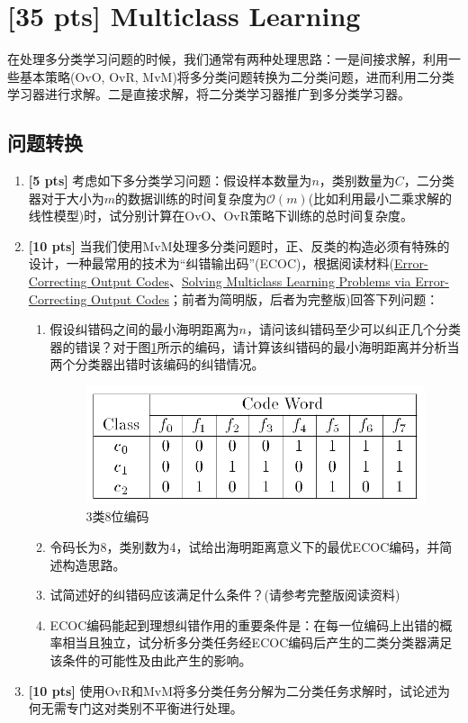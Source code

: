 \documentclass[a4paper,UTF8]{article}
\numberwithin{equation}{section}
\begin{document}
\section{[35 pts] Multiclass Learning}
在处理多分类学习问题的时候，我们通常有两种处理思路：一是间接求解，利用一些基本策略(OvO, OvR, MvM)将多分类问题转换为二分类问题，进而利用二分类学习器进行求解。二是直接求解，将二分类学习器推广到多分类学习器。
\subsection{问题转换}
\begin{enumerate}[(1)]
	\item \textbf{[5 pts]} 考虑如下多分类学习问题：假设样本数量为$n$，类别数量为$C$，二分类器对于大小为$m$的数据训练的时间复杂度为$ \mathcal{O}(m) $(比如利用最小二乘求解的线性模型)时，试分别计算在OvO、OvR策略下训练的总时间复杂度。
	\item \textbf{[10 pts]} 当我们使用MvM处理多分类问题时，正、反类的构造必须有特殊的设计，一种最常用的技术为“纠错输出码”(ECOC)，根据阅读材料(\href{ccs.neu.edu/home/vip/teach/MLcourse/4_boosting/lecture_notes/ecoc/ecoc.pdf}{Error-Correcting Output Codes}、\href{https://arxiv.org/pdf/cs/9501101.pdf}{Solving Multiclass Learning Problems via Error-Correcting Output Codes}\cite{dietterich1994solving}；前者为简明版，后者为完整版)回答下列问题：
	\begin{enumerate}[1)]
		\item 假设纠错码之间的最小海明距离为$n$，请问该纠错码至少可以纠正几个分类器的错误？对于图\ref{img}所示的编码，请计算该纠错码的最小海明距离并分析当两个分类器出错时该编码的纠错情况。
		\begin{figure}[htbp]
			\centering
			\includegraphics[width=.8\textwidth]{figure/codeword.png} %
			\caption{3类8位编码} %
			\label{img} %
		\end{figure}
		\item 令码长为8，类别数为4，试给出海明距离意义下的最优ECOC编码，并简述构造思路。
		\item 试简述好的纠错码应该满足什么条件？(请参考完整版阅读资料)
		\item ECOC编码能起到理想纠错作用的重要条件是：在每一位编码上出错的概率相当且独立，试分析多分类任务经ECOC编码后产生的二类分类器满足该条件的可能性及由此产生的影响。
	\end{enumerate}	
	\item \textbf{[10 pts]} 使用OvR和MvM将多分类任务分解为二分类任务求解时，试论述为何无需专门这对类别不平衡进行处理。
\end{enumerate}
\end{document}
